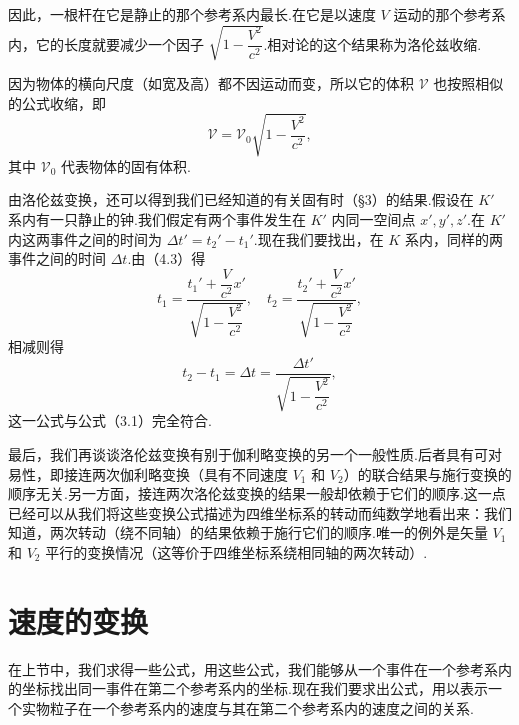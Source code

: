 因此，一根杆在它是静止的那个参考系内最长.在它是以速度 $V$ 运动的那个参考系内，它的长度就要减少一个因子 $\sqrt{1-\dfrac{V^2}{c^2}}$.相对论的这个结果称为洛伦兹收缩.

因为物体的横向尺度（如宽及高）都不因运动而变，所以它的体积 $\mathcal{V}$ 也按照相似的公式收缩，即
\begin{equation}
  \mathcal{V}=\mathcal{V}_0\sqrt{1-\frac{V^2}{c^2}},
\end{equation}
其中 $\mathcal{V}_0$ 代表物体的固有体积.

由洛伦兹变换，还可以得到我们已经知道的有关固有时（§3）的结果.假设在 $K'$ 系内有一只静止的钟.我们假定有两个事件发生在 $K'$ 内同一空间点 $x',y',z'$.在 $K'$ 内这两事件之间的时间为 $\Delta t'=t_2'-t_1'$.现在我们要找出，在 $K$ 系内，同样的两事件之间的时间 $\Delta t$.由（4.3）得
\begin{equation*}
  t_1=\frac{t_1'+\dfrac{V}{c^2}x'}{\sqrt{1-\dfrac{V^2}{c^2}}},\quad
  t_2=\frac{t_2'+\dfrac{V}{c^2}x'}{\sqrt{1-\dfrac{V^2}{c^2}}},
\end{equation*}
相减则得
\begin{equation*}
  t_2-t_1=\Delta t=\frac{\Delta t'}{\sqrt{1-\dfrac{V^2}{c^2}}},
\end{equation*}
这一公式与公式（3.1）完全符合.

最后，我们再谈谈洛伦兹变换有别于伽利略变换的另一个一般性质.后者具有可对易性，即接连两次伽利略变换（具有不同速度 $V_1$ 和 $V_2$）的联合结果与施行变换的顺序无关.另一方面，接连两次洛伦兹变换的结果一般却依赖于它们的顺序.这一点已经可以从我们将这些变换公式描述为四维坐标系的转动而纯数学地看出来：我们知道，两次转动（绕不同轴）的结果依赖于施行它们的顺序.唯一的例外是矢量 $V_1$ 和 $V_2$ 平行的变换情况（这等价于四维坐标系绕相同轴的两次转动）.

\section{速度的变换}

在上节中，我们求得一些公式，用这些公式，我们能够从一个事件在一个参考系内的坐标找出同一事件在第二个参考系内的坐标.现在我们要求出公式，用以表示一个实物粒子在一个参考系内的速度与其在第二个参考系内的速度之间的关系.

